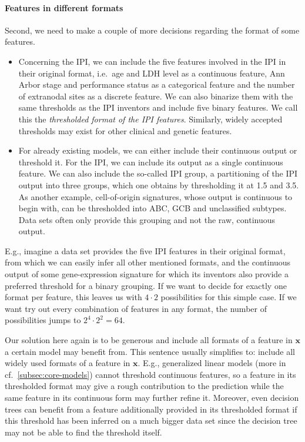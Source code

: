 \paragraph{Features in different formats}
Second, we need to make a couple of more decisions regarding the format of some features.
\begin{itemize}
    \item Concerning the IPI, we can include the five features involved in the IPI in their original
        format, i.e.\ age and LDH level as a continuous feature, Ann Arbor stage and performance 
        status as a categorical feature and the number of extranodal sites as a discrete feature.
        We can also binarize them with the same thresholds as the IPI inventors and include five 
        binary features. We call this the \textit{thresholded format of the IPI features}. 
        Similarly, widely accepted thresholds may exist for other clinical and genetic 
        features.
    \item For already existing models, we can either include their continuous output or threshold 
        it. For the IPI, we can include its output as a single continuous feature. We can also 
        include the so-called IPI group, a partitioning of the IPI output into three groups, which 
        one obtains by thresholding it at \num{1.5} and \num{3.5}. As another example, 
        cell-of-origin signatures, whose output is continuous to begin with, can be thresholded into 
        ABC, GCB and unclassified subtypes. Data sets often only provide this grouping and not the 
        raw, continuous output. 
\end{itemize}

E.g., imagine a data set provides the five IPI features in their original format, from which we can 
easily infer all other mentioned formats, and the continuous output of some gene-expression 
signature for which its inventors also provide a preferred threshold for a binary grouping. 
If we want to decide for 
exactly one format per feature, this leaves us with $4 \cdot 2$ possibilities for this simple case. 
If we want try out every combination of features in any format, the number of possibilities jumps to 
$2^4 \cdot 2^2 = 64$. 

Our solution here again is to be generous and include all formats of a feature in $\mathbf{x}$ a 
certain model may benefit from. This sentence usually 
simplifies to: include all widely used formats of a feature in $\mathbf{x}$. E.g., generalized 
linear models (more in cf.\ \ref{subsec:core-models}) cannot threshold continuous features, so a 
feature in its thresholded format may give 
a rough contribution to the prediction while the same feature in its continuous form may further 
refine it. Moreover, even decision trees can benefit from a feature additionally provided in its 
thresholded format if this threshold has been inferred on a much bigger data set since the decision 
tree may not be able to find the threshold itself.

